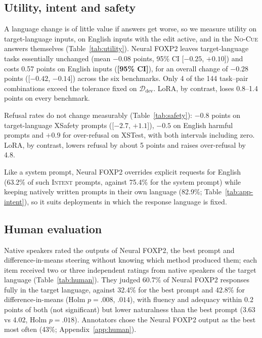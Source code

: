\documentclass[11pt]{article}
\newcommand{\res}[1]{\textcolor{red!70!black}{\textbf{[#1]}}}
\newcommand{\foxp}{Neural FOXP2\xspace}
\newcommand{\Ddev}{\ensuremath{\mathcal{D}_{\mathrm{dev}}}\xspace}
\newcommand{\nocue}{\textsc{No-Cue}\xspace}
\newcommand{\intent}{\textsc{Intent}\xspace}
\begin{document}
\subsection{Utility, intent and safety}
\label{subsec:utility}

A language change is of little value if answers get worse, so we measure utility on target-language inputs, on English inputs with the edit active, and in the \nocue answers themselves (Table~\ref{tab:utility}). \foxp leaves target-language tasks essentially unchanged (mean $-0.08$ points, 95\% CI [$-0.25$, $+0.10$]) and costs 0.57 points on English inputs (\res{95\% CI}), for an overall change of $-0.28$ points ([$-0.42$, $-0.14$]) across the six benchmarks. Only 4 of the 144 task--pair combinations exceed the tolerance fixed on \Ddev. LoRA, by contrast, loses 0.8--1.4 points on every benchmark.

Refusal rates do not change measurably (Table~\ref{tab:safety}): $-0.8$ points on target-language XSafety prompts ([$-2.7$, $+1.1$]), $-0.5$ on English harmful prompts and $+0.9$ for over-refusal on XSTest, with both intervals including zero. LoRA, by contrast, lowers refusal by about 5 points and raises over-refusal by 4.8.

Like a system prompt, \foxp overrides explicit requests for English (63.2\% of such \intent prompts, against 75.4\% for the system prompt) while keeping natively written prompts in their own language (82.9\%; Table~\ref{tab:app-intent}), so it suits deployments in which the response language is fixed.

\subsection{Human evaluation}
\label{subsec:human}

Native speakers rated the outputs of \foxp, the best prompt and difference-in-means steering without knowing which method produced them; each item received two or three independent ratings from native speakers of the target language (Table~\ref{tab:human}). They judged 60.7\% of \foxp responses fully in the target language, against 32.4\% for the best prompt and 42.8\% for difference-in-means (Holm $p=.008$, $.014$), with fluency and adequacy within 0.2 points of both (not significant) but lower naturalness than the best prompt (3.63 vs 4.02, Holm $p=.018$). Annotators chose the \foxp output as the best most often (43\%; Appendix~\ref{app:human}).

\end{document}
